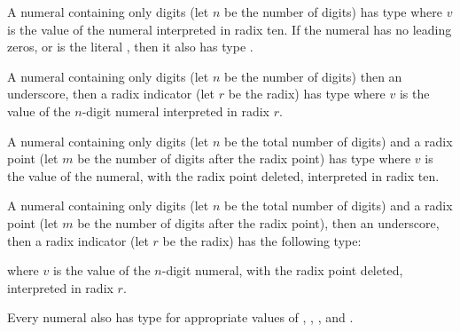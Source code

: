 A numeral containing only digits (let $n$ be the number of digits)
has type  where $v$ is the value of the numeral
interpreted in radix ten.  If the numeral has no leading zeros, or is
the literal , then it also has type .


A numeral containing only digits (let $n$ be the number of
digits) then an underscore, then a radix indicator (let $r$ be the
radix) has type 
where $v$ is
the value of the $n$-digit numeral interpreted in radix $r$.

A numeral containing only digits (let $n$ be the total number
of digits) and a radix point (let $m$ be the number of digits after
the radix point) has type
 where $v$ is
the value of the numeral, with the radix point deleted,
interpreted in radix ten.

A numeral containing only digits (let $n$ be the total number
of digits) and a radix point (let $m$ be the number of digits after
the radix point), then an underscore, then a radix indicator (let $r$
be the radix) has the following type:
\begin{Fortress}
\end{Fortress}
where $v$ is the value of the $n$-digit numeral, with the radix point
deleted, interpreted in radix $r$.

Every numeral also has type
for appropriate values of , , , and .


